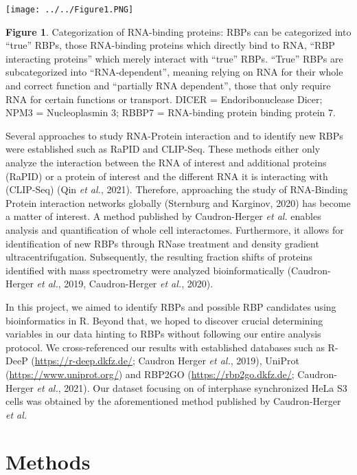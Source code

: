 \documentclass[
]{article}
\begin{document}
\texttt{[image: ../../Figure1.PNG]}

\textbf{Figure 1}. Categorization of RNA-binding proteins: RBPs can be
categorized into ``true'' RBPs, those RNA-binding proteins which
directly bind to RNA, ``RBP interacting proteins'' which merely interact
with ``true'' RBPs. ``True'' RBPs are subcategorized into
``RNA-dependent'', meaning relying on RNA for their whole and correct
function and ``partially RNA dependent'', those that only require RNA
for certain functions or transport. DICER = Endoribonuclease Dicer; NPM3
= Nucleoplasmin 3; RBBP7 = RNA-binding protein binding protein 7.

Several approaches to study RNA-Protein interaction and to identify new
RBPs were established such as RaPID and CLIP-Seq. These methods either
only analyze the interaction between the RNA of interest and additional
proteins (RaPID) or a protein of interest and the different RNA it is
interacting with (CLIP-Seq) (Qin \emph{et al.}, 2021). Therefore,
approaching the study of RNA-Binding Protein interaction networks
globally (Sternburg and Karginov, 2020) has become a matter of interest.
A method published by Caudron-Herger \emph{et al.} enables analysis and
quantification of whole cell interactomes. Furthermore, it allows for
identification of new RBPs through RNase treatment and density gradient
ultracentrifugation. Subsequently, the resulting fraction shifts of
proteins identified with mass spectrometry were analyzed
bioinformatically (Caudron-Herger \emph{et al.}, 2019, Caudron-Herger
\emph{et al.}, 2020).

In this project, we aimed to identify RBPs and possible RBP candidates
using bioinformatics in R. Beyond that, we hoped to discover crucial
determining variables in our data hinting to RBPs without following our
entire analysis protocol. We cross-referenced our results with
established databases such as R-DeeP (\url{https://r-deep.dkfz.de/};
Caudron Herger \emph{et al.}, 2019), UniProt
(\url{https://www.uniprot.org/}) and RBP2GO
(\url{https://rbp2go.dkfz.de/}; Caudron-Herger \emph{et al.}, 2021). Our
dataset focusing on of interphase synchronized HeLa S3 cells was
obtained by the aforementioned method published by Caudron-Herger
\emph{et al.}

\newpage

\hypertarget{methods}{%
\section{Methods}\label{methods}}
\end{document}
